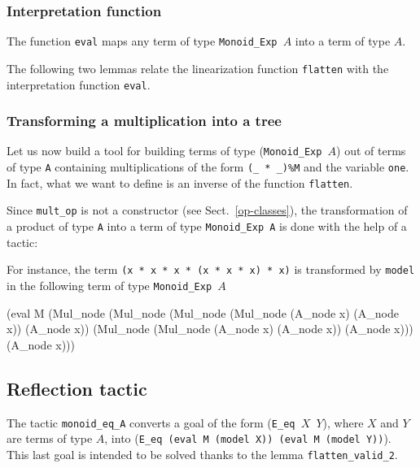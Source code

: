 \subsubsection{Interpretation function}

The function \texttt{eval} maps any term of type \texttt{Monoid\_Exp $A$}
into a term of type \texttt{$A$}.



The following two lemmas relate the linearization function \texttt{flatten}
with the interpretation function \texttt{eval}.


\subsubsection{Transforming a multiplication into a tree}
Let us now build a tool for building terms of type  (\texttt{Monoid\_Exp $A$}) out
of terms of type \texttt{A} containing multiplications of the form 
\Verb|(_ * _)%
In fact, what we want to  define is an inverse of the function \texttt{flatten}.

Since \texttt{mult\_op} is not a constructor (see Sect.~\ref{op-classes}), 
the transformation of  
a product of type \texttt{A} into a term of type \texttt{Monoid\_Exp A}
is done with the help of a tactic:


For instance, the term \texttt{(x * x * x * (x * x * x) * x)} is
transformed by \texttt{model} in the following term of type \texttt{Monoid\_Exp $A$}

\begin{Coqsrc}
(eval M
   (Mul_node
     (Mul_node 
        (Mul_node (Mul_node (A_node x) (A_node x)) (A_node x))
        (Mul_node (Mul_node (A_node x) (A_node x)) (A_node x))) 
     (A_node x)))  
\end{Coqsrc}


\subsection{Reflection tactic}
The tactic \texttt{monoid\_eq\_A} converts a goal of the form 
(\texttt{E\_eq $X$ $Y$}), where
\texttt{$X$} and \texttt{$Y$} are terms of type $A$, into
(\texttt{E\_eq (eval M  (model X)) (eval M  (model Y))}). This last goal is intended to be solved thanks 
to the lemma \texttt{flatten\_valid\_2}.

